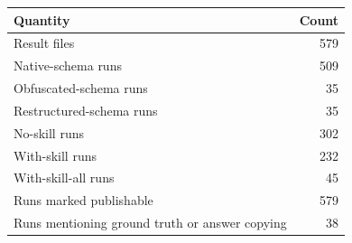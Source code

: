 \begin{tabular}{lr}
\toprule
Quantity & Count \\
\midrule
Result files & 579 \\
Native-schema runs & 509 \\
Obfuscated-schema runs & 35 \\
Restructured-schema runs & 35 \\
No-skill runs & 302 \\
With-skill runs & 232 \\
With-skill-all runs & 45 \\
Runs marked publishable & 579 \\
Runs mentioning ground truth or answer copying & 38 \\
\bottomrule
\end{tabular}
